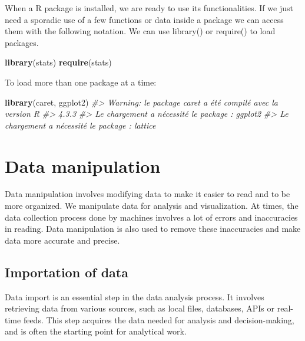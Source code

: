 \documentclass[
]{book}
\newenvironment{Shaded}{\begin{snugshade}}{\end{snugshade}}
\newcommand{\CommentTok}[1]{\textcolor[rgb]{0.56,0.35,0.01}{\textit{#1}}}
\newcommand{\FunctionTok}[1]{\textcolor[rgb]{0.13,0.29,0.53}{\textbf{#1}}}
\newcommand{\NormalTok}[1]{#1}
\begin{document}
When a R package is installed, we are ready to use its functionalities. If we just need a sporadic use of a few functions or data inside a package we can access them with the following notation.
We can use library() or require() to load packages.

\begin{Shaded}
\begin{Highlighting}[]
\FunctionTok{library}\NormalTok{(stats)}
\FunctionTok{require}\NormalTok{(stats)}
\end{Highlighting}
\end{Shaded}

To load more than one package at a time:

\begin{Shaded}
\begin{Highlighting}[]
\FunctionTok{library}\NormalTok{(caret, ggplot2)}
\CommentTok{\#\textgreater{} Warning: le package \textquotesingle{}caret\textquotesingle{} a été compilé avec la version R}
\CommentTok{\#\textgreater{} 4.3.3}
\CommentTok{\#\textgreater{} Le chargement a nécessité le package : ggplot2}
\CommentTok{\#\textgreater{} Le chargement a nécessité le package : lattice}
\end{Highlighting}
\end{Shaded}

\hypertarget{data-manipulation}{%
\chapter{Data manipulation}\label{data-manipulation}}

Data manipulation involves modifying data to make it easier to read and to be more organized. We manipulate data for analysis and visualization. At times, the data collection process done by machines involves a lot of errors and inaccuracies in reading. Data manipulation is also used to remove these inaccuracies and make data more accurate and precise.

\hypertarget{importation-of-data}{%
\section{Importation of data}\label{importation-of-data}}

Data import is an essential step in the data analysis process. It involves retrieving data from various sources, such as local files, databases, APIs or real-time feeds. This step acquires the data needed for analysis and decision-making, and is often the starting point for analytical work.
\end{document}
